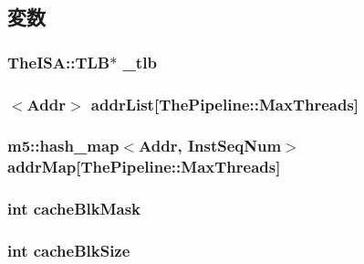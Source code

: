 \subsection{変数}
\hypertarget{classCacheUnit_a5aa23855b427a009f3334c95a146084b}{
\subsubsection[{\_\-tlb}]{\setlength{\rightskip}{0pt plus 5cm}TheISA::TLB$\ast$ {\bf \_\-tlb}}}
\label{classCacheUnit_a5aa23855b427a009f3334c95a146084b}
\hypertarget{classCacheUnit_a66e9796fd56a3a307b1095ff8da5a4c8}{
\subsubsection[{addrList}]{$<${\bf Addr}$>$ {\bf addrList}\mbox{[}{\bf ThePipeline::MaxThreads}\mbox{]}}}
\label{classCacheUnit_a66e9796fd56a3a307b1095ff8da5a4c8}
\hypertarget{classCacheUnit_a9748daf7b829518c81be2287ecbc032d}{
\subsubsection[{addrMap}]{\setlength{\rightskip}{0pt plus 5cm}m5::hash\_\-map$<${\bf Addr}, {\bf InstSeqNum}$>$ {\bf addrMap}\mbox{[}{\bf ThePipeline::MaxThreads}\mbox{]}}}
\label{classCacheUnit_a9748daf7b829518c81be2287ecbc032d}
\hypertarget{classCacheUnit_a4abab6f8643f5958a53eec1355be3ebd}{
\subsubsection[{cacheBlkMask}]{\setlength{\rightskip}{0pt plus 5cm}int {\bf cacheBlkMask}}}
\label{classCacheUnit_a4abab6f8643f5958a53eec1355be3ebd}
\hypertarget{classCacheUnit_a9d95d13b55fcaa47810d188d54903caf}{
\subsubsection[{cacheBlkSize}]{\setlength{\rightskip}{0pt plus 5cm}int {\bf cacheBlkSize}}}
